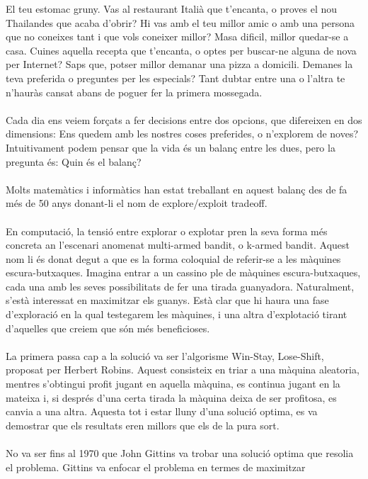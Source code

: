 
El teu estomac gruny. Vas al restaurant Italià que t'encanta, 
o proves el nou Thailandes que acaba d'obrir? Hi vas amb el 
teu millor amic o amb una persona que no coneixes tant i que 
vols coneixer millor? Masa dificil, millor quedar-se a casa. 
Cuines aquella recepta que t'encanta, o optes per buscar-ne 
alguna de nova per Internet? Saps que, potser millor demanar
una pizza a domicili. Demanes la teva preferida o preguntes 
per les especials? Tant dubtar entre una o l'altra te n'hauràs
cansat abans de poguer fer la primera mossegada.
\\\\
Cada dia ens veiem forçats a fer decisions entre dos opcions,
que difereixen en dos dimensions: Ens quedem amb les nostres
coses preferides, o n'explorem de noves? Intuitivament podem
pensar que la vida és un balanç entre les dues, pero la pregunta
és: Quin és el balanç?
\\\\
Molts matemàtics i informàtics han estat treballant en aquest
balanç des de fa més de 50 anys donant-li el nom de explore/exploit
tradeoff.
\\\\
En computació, la tensió entre explorar o explotar pren la seva 
forma més concreta an l'escenari anomenat multi-armed bandit, o
k-armed bandit. Aquest nom li és donat degut a que es la forma
coloquial de referir-se a les màquines escura-butxaques.
Imagina entrar a un cassino ple de màquines escura-butxaques,
cada una amb les seves possibilitats de fer una tirada guanyadora.
Naturalment, s'està interessat en maximitzar els guanys. Està clar
que hi haura una fase d'exploració en la qual testegarem les màquines,
i una altra d'explotació tirant d'aquelles que creiem que són més 
beneficioses.\\
\\
La primera passa cap a la solució va ser l'algorisme Win-Stay, Lose-Shift,
proposat per Herbert Robins. Aquest consisteix en triar a una màquina 
aleatoria, mentres s'obtingui profit jugant en aquella màquina, es continua
jugant en la mateixa i, si després d'una certa tirada la màquina deixa de ser 
profitosa, es canvia a una altra. Aquesta tot i estar lluny d'una solució optima,
es va demostrar que els resultats eren millors que els de la pura sort.\\
\\
No va ser fins al 1970 que John Gittins va trobar una solució optima que 
resolia el problema. Gittins va enfocar el problema en termes de maximitzar
